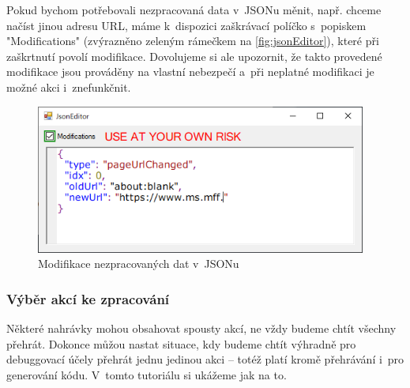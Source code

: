 \documentclass[12pt, a4paper, twoside]{article}
\begin{document}
	\newpage
	Pokud bychom potřebovali nezpracovaná data v~JSONu měnit, např. chceme načíst jinou adresu URL, máme k~dispozici zaškrávací políčko s~popiskem "Modifications" (zvýrazněno zeleným rámečkem na \cref{fig:jsonEditor}), které při zaškrtnutí povolí modifikace. Dovolujeme si ale upozornit, že takto provedené modifikace jsou prováděny na vlastní nebezpečí a~při neplatné modifikaci je možné akci i~znefunkčnit.
	\begin{figure}[H]
		\centering
		\includegraphics[width=0.97\textwidth]{jsonModificationInProgress.png}
		\caption{Modifikace nezpracovaných dat v~JSONu}
	\end{figure}
	\subsubsection{Výběr akcí ke zpracování}
	Některé nahrávky mohou obsahovat spousty akcí, ne vždy budeme chtít všechny přehrát. Dokonce můžou nastat situace, kdy budeme chtít výhradně pro debuggovací účely přehrát jednu jedinou akci -- totéž platí kromě přehrávání i~pro generování kódu. V~tomto tutoriálu si ukážeme jak na to.
	
\end{document}
